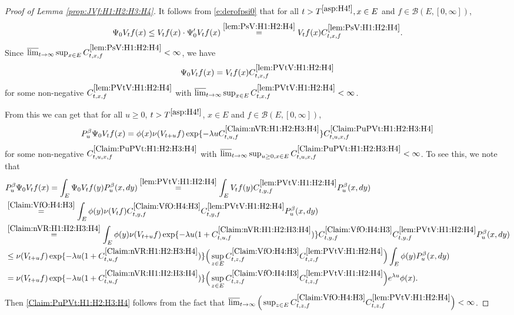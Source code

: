 \documentclass[12pt,a4paper]{amsart}
\numberwithin{equation}{section}
\theoremstyle{plain}
\theoremstyle{definition}
\theoremstyle{remark}
\begin{document}
\begin{proof}[Proof of Lemma \ref{prop:JVf:H1:H2:H3:H4}]
	It follows from \eqref{e:derofpsi0} that for all $t> T^{\eqref{asp:H4!}}, x\in E$ and $f\in \mathcal B(E,[0,\infty])$,
\begin{equation}
	\Psi_0 V_t f (x)
	\leq V_tf(x)\cdot \Psi_0' V_t f(x) \overset{\eqref{lem:PsV:H1:H2:H4}}= V_tf(x) C^{\eqref{lem:PsV:H1:H2:H4}}_{t,x,f}.
\end{equation}
Since $\varlimsup_{t\to \infty} \sup_{x\in E} C^{\eqref{lem:PsV:H1:H2:H4}}_{t,x,f} <\infty$, we have
\begin{equation} \label{lem:PVtV:H1:H2:H4}
	\Psi_0 V_t f(x) = V_tf(x) C^{\eqref{lem:PVtV:H1:H2:H4}}_{t,x,f}
\end{equation}
	for some non-negative $C^{\eqref{lem:PVtV:H1:H2:H4}}_{t,x,f}$ with $\varlimsup_{t\to \infty} \sup_{x\in E}C^{\eqref{lem:PVtV:H1:H2:H4}}_{t,x,f} < \infty$.

	From this we can get that for all $u\geq 0$, $t>T^{\eqref{asp:H4!}}$, $x\in E$ and $f\in \mathcal B(E,[0,\infty])$,
\begin{equation} \label{Claim:PuPVt:H1:H2:H3:H4}
	P_u^\beta \Psi_0 V_{t} f(x) = \phi(x)\nu(V_{t+u}f) \exp\{-\lambda u C^{\eqref{Claim:nVR:H1:H2:H3:H4}}_{t,u,f} \} C^{\eqref{Claim:PuPVt:H1:H2:H3:H4}}_{t,u,x,f}
\end{equation}
	for some non-negative $C^{\eqref{Claim:PuPVt:H1:H2:H3:H4}}_{t,u,x,f}$ with $\varlimsup_{t\to \infty} \sup_{u\geq 0, x\in E} C^{\eqref{Claim:PuPVt:H1:H2:H3:H4}}_{t,u,x,f} < \infty$.
	To see this, we note that
	\begin{align}
	&P_u^\beta \Psi_0 V_{t} f(x)
	= \int_{E} \Psi_0V_tf(y) P_u^\beta (x,dy)
	\overset{\eqref{lem:PVtV:H1:H2:H4}}=\int_{E} V_tf(y)C^{\eqref{lem:PVtV:H1:H2:H4}}_{t,y,f} P_u^\beta (x,dy)
	\\&\overset{\eqref{Claim:VfO:H4:H3}}=\int_{E} \phi(y)\nu(V_tf)C^{\eqref{Claim:VfO:H4:H3}}_{t,y,f}C^{\eqref{lem:PVtV:H1:H2:H4}}_{t,y,f} P_u^\beta (x,dy)
	\\&\overset{\eqref{Claim:nVR:H1:H2:H3:H4}}=\int_{E} \phi(y)\nu(V_{t+u}f) \exp\{-\lambda u (1+C^{\eqref{Claim:nVR:H1:H2:H3:H4}}_{t,u,f}) \} C^{\eqref{Claim:VfO:H4:H3}}_{t,y,f}C^{\eqref{lem:PVtV:H1:H2:H4}}_{t,y,f} P_u^\beta (x,dy)
	\\& \leq \nu(V_{t+u}f) \exp\{-\lambda u (1+C^{\eqref{Claim:nVR:H1:H2:H3:H4}}_{t,u,f}) \} \Big(\sup_{z\in E} C^{\eqref{Claim:VfO:H4:H3}}_{t,z,f}C^{\eqref{lem:PVtV:H1:H2:H4}}_{t,z,f}\Big) \int_{E} \phi(y) P_u^\beta (x,dy)
	\\& = \nu(V_{t+u}f) \exp\{-\lambda u (1+C^{\eqref{Claim:nVR:H1:H2:H3:H4}}_{t,u,f}) \} \Big(\sup_{z\in E} C^{\eqref{Claim:VfO:H4:H3}}_{t,z,f}C^{\eqref{lem:PVtV:H1:H2:H4}}_{t,z,f}\Big) e^{\lambda u}\phi(x).
	\end{align}
	Then \eqref{Claim:PuPVt:H1:H2:H3:H4} follows from the fact that $\varlimsup_{t\to \infty} \Big(\sup_{z\in E} C^{\eqref{Claim:VfO:H4:H3}}_{t,z,f}C^{\eqref{lem:PVtV:H1:H2:H4}}_{t,z,f}\Big) < \infty$.
	

\end{proof}
\end{document}
